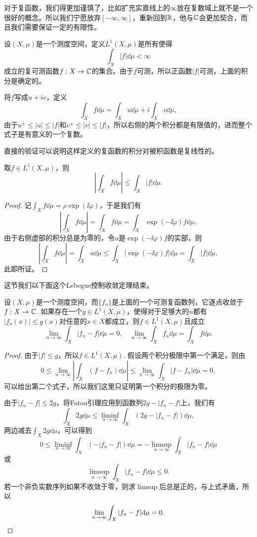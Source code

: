 \begin{para}
对于复函数，我们得更加谨慎了，比如扩充实直线上的$\infty$放在复数域上就不是一个很好的概念。所以我们宁愿放弃$[-\infty,\infty]$，重新回到$\mathbb{R}$，他与$\mathbb{C}$会更加契合，而且我们需要保证一定的有限性。

设$(X,\mu)$是一个测度空间，定义$L^1(X,\mu)$是所有使得
\[
	\int_X |f|\dd \mu <\infty
\]
成立的复可测函数$f:X\to \mathbb{C}$的集合。由于$f$可测，所以正函数$|f|$可测，上面的积分是确定的。

将$f$写成$u+iv$，定义
\[
	\int_X f\dd \mu =\int_X u\dd \mu +i \int_X v\dd \mu,
\]
由于$u^\pm\leq |u| \leq |f|$和$v^\pm\leq |v| \leq |f|$，所以右侧的两个积分都是有限值的，进而整个式子是有意义的一个复数。

直接的验证可以说明这样定义的复函数的积分对被积函数是复线性的。
\end{para}

\begin{pro}
取$f\in L^1(X,\mu)$，则
\[
	\left|\int_X f\dd \mu\right| \leq \int_X |f|\dd \mu.
\]
\end{pro}

\begin{proof}
记$\int_X f\dd \mu=\rho \exp(\ii \varphi)$，于是我们有
\[
	\left|\int_X f\dd \mu\right|=\int_X f\dd \mu=\int_X \exp(-\ii \varphi)f\dd \mu,
\]
由于右侧虚部的积分总是为零的，令$u$是$\exp(-\ii \varphi)f$的实部，则
\[
	\left|\int_X f\dd \mu\right|=\int_X u\dd \mu\leq \int_X |\exp(-\ii \varphi)f|\dd \mu=\int_X |f|\dd \mu,
\]
此即所证。
\end{proof}

这节我们以下面这个Lebegue控制收敛定理结束。

\begin{thm}[Lebegue控制收敛定理]
设$(X,\mu)$是一个测度空间，而$\{f_n\}$是上面的一个可测复函数列，它逐点收敛于$f:X\to \mathbb{C}$. 如果存在一个$g\in L^1(X,\mu)$，使得对于足够大的$n$都有$|f_n(x)|\leq g(x)$对任意的$x\in X$都成立，则$f\in L^1(X,\mu)$且成立
\[
	\lim_{n\to\infty}\int_X |f_n-f|\dd\mu=0,\quad \lim_{n\to\infty}\int_X f_n\dd\mu=\int_X f\dd\mu.
\]
\end{thm}

\begin{proof}
由于$|f|\leq g$，所以$f\in L^1(X,\mu)$. 假设两个积分极限中第一个满足，则由
\[
	0\leq \lim_{n\to \infty} \left| \int_X (f-f_n)\dd \mu\right|\leq\lim_{n\to \infty}\int_X |f-f_n|\dd \mu=0,
\]
可以给出第二个式子，所以我们这里只证明第一个积分的极限为零。

由于$|f_n-f|\leq 2g$，将Fatou引理应用到函数列$2g-|f_n-f|$上，我们有
\[
	\int_X 2g \dd \mu\leq \liminf_{n\to \infty}\int_X \left(2g-|f_n-f|\right) \dd \mu,
\]
两边减去$\int_X 2g \dd \mu$，可以得到
\[
	0\leq \liminf_{n\to \infty}\int_X \left(-|f_n-f|\right) \dd \mu=-\limsup_{n\to \infty}\int_X |f_n-f| \dd \mu
\]
或
\[
	\limsup_{n\to \infty}\int_X |f_n-f| \dd \mu\leq 0.
\]
若一个非负实数序列如果不收敛于零，则求$\limsup$后总是正的，与上式矛盾，所以
\[
	\lim_{n\to \infty}\int_X |f_n-f| \mathrm{d} \mu=0.\qedhere
\]
\end{proof}

